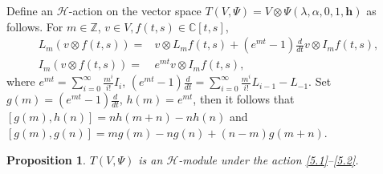 \documentclass[a4paper]{amsart}
\numberwithin{equation}{section}
\newtheorem{proposition}[theorem]{Proposition}
\begin{document}
 Define an $\mathcal{H}$-action on the vector space $T(V,\Psi)=V\otimes \Psi(\lambda,\alpha,0,1,\mathbf{h})$ as follows. For $m\in \mathbb{Z}$, $v\in V,f(t,s)\in\mathbb{C}[t,s]$,
\begin{align}
    L_{m}(v\otimes f(t,s))=&v\otimes L_{m} f(t,s)+(e^{mt}-1)\frac{d}{dt}v\otimes I_{m} f(t,s),\label{5.1}\\
    I_{m}(v\otimes f(t,s))=&e^{mt}v\otimes I_{m}f(t,s),\label{5.2}
\end{align}
where $e^{mt}=\sum_{i=0}^{\infty}\frac{m^{i}}{i!}I_{i}$, $(e^{mt}-1)\frac{d}{dt}=\sum_{i=0}^{\infty}\frac{m^{i}}{i!}L_{i-1}-L_{-1}$. Set $g(m)=(e^{mt}-1)\frac{d}{dt}$, $h(m)=e^{mt}$, then it follows that $[g(m),h(n)]=nh(m+n)-nh(n)$ and $[g(m),g(n)]=mg(m)-ng(n)+(n-m)g(m+n)$.
\begin{proposition}
    $T(V,\Psi)$ is an $\mathcal{H}$-module under the action \eqref{5.1}--\eqref{5.2}.
\end{proposition}
\end{document}
